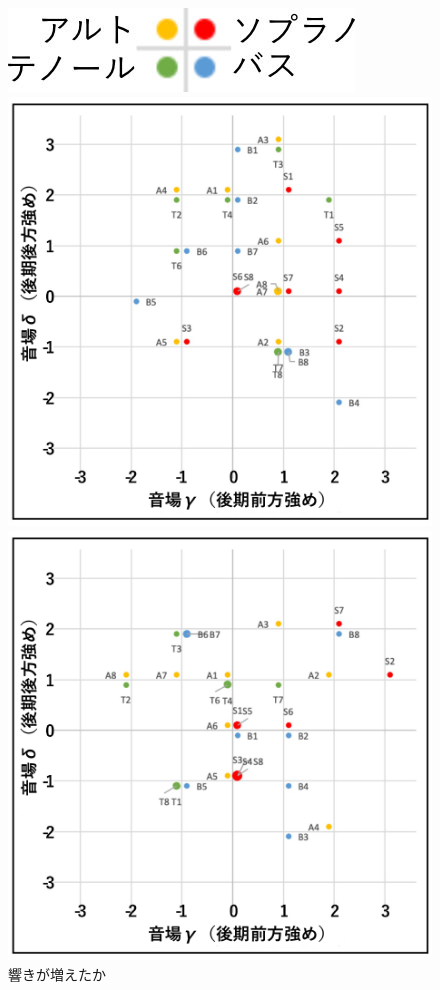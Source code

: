 \documentclass[11pt,a4j]{jreport}
\begin{document}
\begin{figure}[H]
  \begin{minipage}{1\linewidth}
    \centering
    \includegraphics[scale=.7]{images/subjectiveExp/scat_0_legend.jpg}
  \end{minipage}

  \begin{minipage}{0.5\linewidth}
    \centering
    \includegraphics[width=.9\linewidth]{images/subjectiveExp/scat_late_01reverb.pdf}
    \caption*{響きが増えたか}
  \end{minipage}%
  \begin{minipage}{0.5\linewidth}
    \centering
    \includegraphics[width=.9\linewidth]{images/subjectiveExp/scat_late_02selfVoice.pdf}

\end{minipage}
\end{figure}
\end{document}
